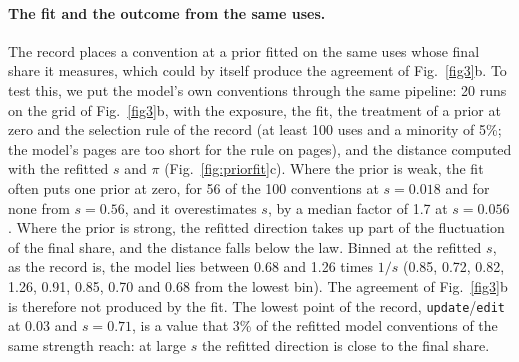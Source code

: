 \documentclass[10pt]{article}
\begin{document}
\paragraph{The fit and the outcome from the same uses.} The record places a convention at a prior fitted on the same uses whose final share it measures, which could by itself produce the agreement of Fig.~\ref{fig3}b. To test this, we put the model's own conventions through the same pipeline: 20 runs on the grid of Fig.~\ref{fig3}b, with the exposure, the fit, the treatment of a prior at zero and the selection rule of the record (at least 100 uses and a minority of 5\%; the model's pages are too short for the rule on pages), and the distance computed with the refitted $s$ and $\pi$ (Fig.~\ref{fig:priorfit}c). Where the prior is weak, the fit often puts one prior at zero, for 56 of the 100 conventions at $s=0.018$ and for none from $s=0.56$, and it overestimates $s$, by a median factor of 1.7 at $s=0.056$. Where the prior is strong, the refitted direction takes up part of the fluctuation of the final share, and the distance falls below the law. Binned at the refitted $s$, as the record is, the model lies between 0.68 and 1.26 times $1/s$ (0.85, 0.72, 0.82, 1.26, 0.91, 0.85, 0.70 and 0.68 from the lowest bin). The agreement of Fig.~\ref{fig3}b is therefore not produced by the fit. The lowest point of the record, \texttt{update}/\texttt{edit} at 0.03 and $s=0.71$, is a value that 3\% of the refitted model conventions of the same strength reach: at large $s$ the refitted direction is close to the final share.
\end{document}
